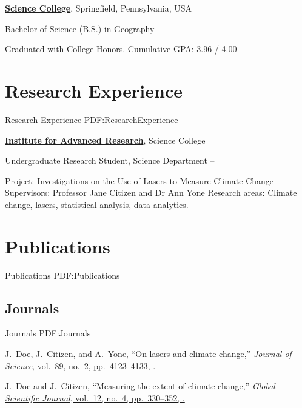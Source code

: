 \documentclass[a4paper,10pt,oneside]{article}
\begin{document}
\begin{body}
\EntryGap
\href{http://www.example.com/my-college}
{\textbf{Science College}},
Springfield, Pennsylvania, USA
\par
Bachelor of Science (B.S.) in
\href{http://www.example.com/my-department}
{Geography}
\hfill
{} --
\begin{detail}
\BulletItem
Graduated with College Honors.
\BulletItem
Cumulative GPA: 3.96 / 4.00
\end{detail}


\section
{Research Experience}
{Research Experience}
{PDF:ResearchExperience}

\href{http://www.example.com/my-institute}
{\textbf{Institute for Advanced Research}},
Science College
\par
Undergraduate Research Student, Science Department
\hfill
{} --
\begin{detail}
\BulletItem
Project:
Investigations on the Use of Lasers to Measure Climate Change
\BulletItem
Supervisors:
Professor Jane Citizen and
Dr Ann Yone
\BulletItem
Research areas:
Climate change, lasers, statistical analysis, data analytics.
\end{detail}


\section
{Publications}
{Publications}
{PDF:Publications}

\subsection
{Journals}
{Journals}
{PDF:Journals}

\EntryGap
{}
\href{http://www.example.com/my-paper-doi-4}
{\underline{J.~Doe}, J.~Citizen, and A.~Yone,
``On lasers and climate change,''
\textit{Journal of Science},
vol.~89,
no.~2,
pp.~4123--4133,
.}

\EntryGap
{}
\href{http://www.example.com/my-paper-doi-3}
{\underline{J.~Doe} and J.~Citizen,
``Measuring the extent of climate change,''
\textit{Global Scientific Journal},
vol.~12,
no.~4,
pp.~330--352,
.}


\end{body}
\end{document}

